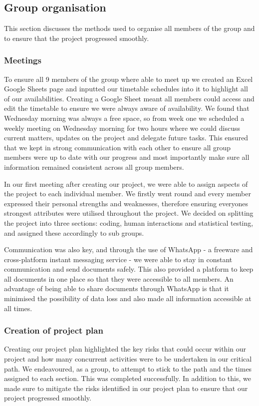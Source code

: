 \documentclass[a4paper,titlepage]{article}
\begin{document}
\subsection{Group organisation}
This section discusses the methods used to organise all members of the group and to ensure that the project progressed smoothly.

\subsubsection{Meetings}
To ensure all 9 members of the group where able to meet up we created an Excel Google Sheets page and inputted our timetable schedules into it to highlight all of our availabilities. Creating a Google Sheet meant all members could access and edit the timetable to ensure we were always aware of availability. We found that Wednesday morning was always a free space, so from week one we scheduled a weekly meeting on Wednesday morning for two hours where we could discuss current matters, updates on the project and delegate future tasks. This ensured that we kept in strong communication with each other to ensure all group members were up to date with our progress and most importantly make sure all information remained consistent across all group members.

In our first meeting after creating our project, we were able to assign aspects of the project to each individual member. We firstly went round and every member expressed their personal strengths and weaknesses, therefore ensuring everyones strongest attributes were utilised throughout the project. We decided on splitting the project into three sections: coding, human interactions and statistical testing, and assigned these accordingly to sub groups.

Communication was also key, and through the use of WhatsApp - a freeware and cross-platform instant messaging service - we were able to stay in constant communication and send documents safely. This also provided a platform to keep all documents in one place so that they were accessible to all members. An advantage of being able to share documents through WhatsApp is that it minimised the possibility of data loss and also made all information accessible at all times.

\subsubsection{Creation of project plan}
Creating our project plan highlighted the key risks that could occur within our project and how many concurrent activities were to be undertaken in our critical path. We endeavoured, as a group, to attempt to stick to the path and the times assigned to each section. This was completed successfully.
In addition to this, we made sure to mitigate the risks identified in our project plan to ensure that our project progressed smoothly.
\end{document}
